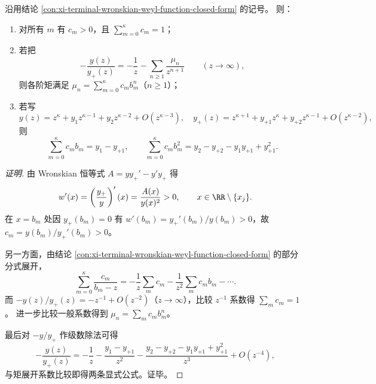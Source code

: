 \begin{conclusion}\label{con:xi-terminal-wronskian-spectral-weights-moment-identities}
沿用结论 \ref{con:xi-terminal-wronskian-weyl-function-closed-form} 的记号。
则：
\begin{enumerate}
  \item 对所有 \(m\) 有 \(c_m>0\)，且 \(\sum_{m=0}^{\kappa}c_m=1\)；
  \item 若把
  \[
  -\frac{y(z)}{y_{+}(z)}=-\frac{1}{z}-\sum_{n\ge 1}\frac{\mu_n}{z^{n+1}}
  \qquad (z\to\infty),
  \]
  则各阶矩满足 \(\mu_n=\sum_{m=0}^{\kappa}c_m b_m^{n}\)（\(n\ge 1\)）；
  \item 若写
  \[
  y(z)=z^{\kappa}+y_1 z^{\kappa-1}+y_2 z^{\kappa-2}+O(z^{\kappa-3}),\quad
  y_{+}(z)=z^{\kappa+1}+y_{+1}z^{\kappa}+y_{+2}z^{\kappa-1}+O(z^{\kappa-2}),
  \]
  则
  \[
  \sum_{m=0}^{\kappa}c_m b_m=y_1-y_{+1},\qquad
  \sum_{m=0}^{\kappa}c_m b_m^{2}=y_2-y_{+2}-y_1y_{+1}+y_{+1}^{2}.
  \]
\end{enumerate}
\end{conclusion}
\begin{proof}[证明]
由 Wronskian 恒等式 \(A=yy_{+}'-y'y_{+}\) 得
\[
w'(x)=\left(\frac{y_{+}}{y}\right)'(x)=\frac{A(x)}{y(x)^2}>0,
\qquad x\in\RR\setminus\{x_j\}.
\]
在 \(x=b_m\) 处因 \(y_{+}(b_m)=0\) 有
\(
w'(b_m)=y_{+}'(b_m)/y(b_m)>0
\)，故 \(c_m=y(b_m)/y_{+}'(b_m)>0\)。

另一方面，由结论 \ref{con:xi-terminal-wronskian-weyl-function-closed-form} 的部分分式展开，
\[
\sum_{m=0}^{\kappa}\frac{c_m}{b_m-z}
=-\frac{1}{z}\sum_{m}c_m-\frac{1}{z^2}\sum_{m}c_m b_m-\cdots .
\]
而 \(-y(z)/y_{+}(z)=-z^{-1}+O(z^{-2})\)（\(z\to\infty\)），比较 \(z^{-1}\) 系数得 \(\sum_m c_m=1\)。
进一步比较一般系数得到 \(\mu_n=\sum_m c_m b_m^{n}\)。

最后对 \(-y/y_{+}\) 作级数除法可得
\[
-\frac{y(z)}{y_{+}(z)}
=-\frac{1}{z}-\frac{y_1-y_{+1}}{z^2}
-\frac{y_2-y_{+2}-y_1y_{+1}+y_{+1}^2}{z^3}+O(z^{-4}),
\]
与矩展开系数比较即得两条显式公式。证毕。
\end{proof}

\endinput
